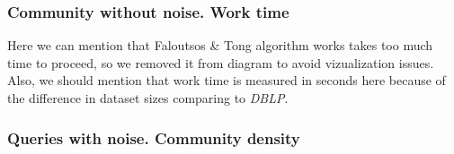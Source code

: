 \subsubsection{Community without noise. Work time}

  \begin{center}
  \end{center}

Here we can mention that Faloutsos \& Tong \cite{Faloutsos06} algorithm works takes too much time to proceed, so we removed it from diagram to avoid vizualization issues. Also, we should mention that work time is measured in seconds here because of the difference in dataset sizes comparing to \textit{DBLP}.

\subsubsection{Queries with noise. Community density}

  \begin{center}
  \end{center}

